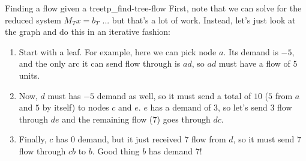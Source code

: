 \begin{example}{Finding a flow given a tree}{tp_find-tree-flow}
First, note that we can solve for the reduced system $M_Tx = b_T$ ... but that's a lot of work. Instead, let's just look at the graph and do this in an iterative fashion:
\begin{enumerate}[label=(\arabic*)]
  \item Start with a leaf. For example, here we can pick node $a$. Its demand is $-5$, and the only arc it can send flow through is $ad$, so $ad$ must have a flow of $5$ units.
  \item Now, $d$ must has $-5$ demand as well, so it must send a total of $10$ ($5$ from $a$ and $5$ by itself) to nodes $c$ and $e$. $e$ has a demand of $3$, so let's send $3$ flow through $de$ and the remaining flow ($7$) goes through $dc$.
  \item Finally, $c$ has $0$ demand, but it just received $7$ flow from $d$, so it must send $7$ flow through $cb$ to $b$. Good thing $b$ has demand $7$!
\end{enumerate}

\begin{minipage}{0.33\textwidth}
  \centering
\end{minipage}
\begin{minipage}{0.33\textwidth}
  \centering
\end{minipage}
\end{example}
